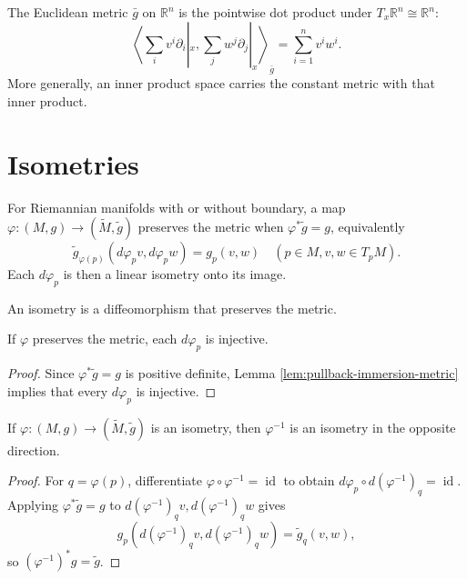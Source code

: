 \begin{definition}
\label{ex:euclidean-metric}
\leanok
{}
The Euclidean metric $\bar g$ on $\mathbb R^n$ is the pointwise dot product under $T_x\mathbb R^n\cong\mathbb R^n$:
\[
\left\langle\sum_i v^i\partial_i|_x,\sum_j w^j\partial_j|_x\right\rangle_{\bar g}=\sum_{i=1}^n v^i w^i.
\]
More generally, an inner product space carries the constant metric with that inner product.
\end{definition}

\section{Isometries}

\begin{definition}
\label{def:metric-preserving}
\leanok
{}
For Riemannian manifolds with or without boundary, a map $\varphi:(M,g)\to(\widetilde M,\widetilde g)$ preserves the metric when $\varphi^*\widetilde g=g$, equivalently
\[
\widetilde g_{\varphi(p)}(d\varphi_pv,d\varphi_pw)=g_p(v,w)
\quad(p\in M, v,w\in T_pM).
\]
Each $d\varphi_p$ is then a linear isometry onto its image.
\end{definition}

\begin{definition}[Isometry]
\label{def:isometry}
\leanok
{}
An isometry is a diffeomorphism that preserves the metric.
\end{definition}

\begin{lemma}
\label{lem:metric-preserving-immersion}
\leanok
{}
If $\varphi$ preserves the metric, each $d\varphi_p$ is injective.
\end{lemma}
\begin{proof}
\leanok
{}
\sketch Since $\varphi^*\widetilde g=g$ is positive definite, Lemma \ref{lem:pullback-immersion-metric} implies that every $d\varphi_p$ is injective.
\end{proof}

\begin{lemma}
\label{lem:isometry-symm}
\leanok
{}
If $\varphi:(M,g)\to(\widetilde M,\widetilde g)$ is an isometry, then $\varphi^{-1}$ is an isometry in the opposite direction.
\end{lemma}
\begin{proof}
\leanok
{}
\sketch For $q=\varphi(p)$, differentiate $\varphi\circ\varphi^{-1}=\operatorname{id}$ to obtain $d\varphi_p\circ d(\varphi^{-1})_q=\operatorname{id}$. Applying $\varphi^*\widetilde g=g$ to $d(\varphi^{-1})_qv,d(\varphi^{-1})_qw$ gives
\[
g_p(d(\varphi^{-1})_qv,d(\varphi^{-1})_qw)=\widetilde g_q(v,w),
\]
so $(\varphi^{-1})^*g=\widetilde g$.
\end{proof}

